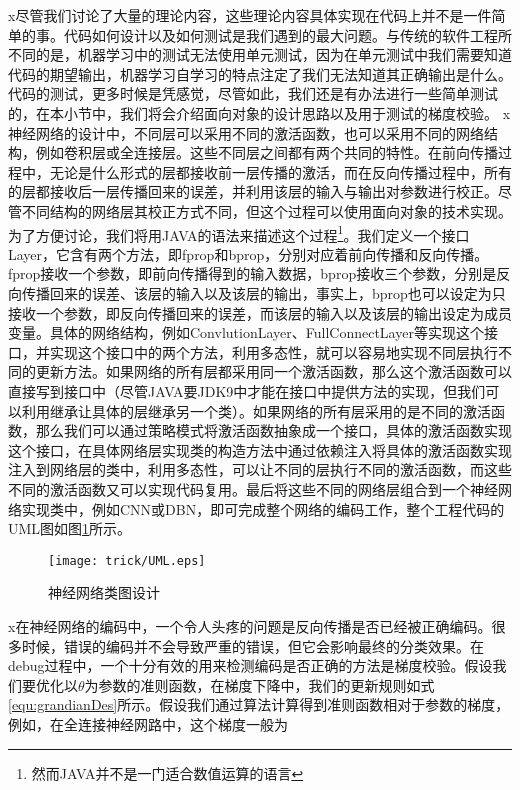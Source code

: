x尽管我们讨论了大量的理论内容，这些理论内容具体实现在代码上并不是一件简单的事。代码如何设计以及如何测试是我们遇到的最大问题。与传统的软件工程所不同的是，机器学习中的测试无法使用单元测试，因为在单元测试中我们需要知道代码的期望输出，机器学习自学习的特点注定了我们无法知道其正确输出是什么。代码的测试，更多时候是凭感觉，尽管如此，我们还是有办法进行一些简单测试的，在本小节中，我们将会介绍面向对象的设计思路以及用于测试的梯度校验。
x神经网络的设计中，不同层可以采用不同的激活函数，也可以采用不同的网络结构，例如卷积层或全连接层。这些不同层之间都有两个共同的特性。在前向传播过程中，无论是什么形式的层都接收前一层传播的激活，而在反向传播过程中，所有的层都接收后一层传播回来的误差，并利用该层的输入与输出对参数进行校正。尽管不同结构的网络层其校正方式不同，但这个过程可以使用面向对象的技术实现。为了方便讨论，我们将用JAVA的语法来描述这个过程\footnote{然而JAVA并不是一门适合数值运算的语言}。我们定义一个接口Layer，它含有两个方法，即fprop和bprop，分别对应着前向传播和反向传播。fprop接收一个参数，即前向传播得到的输入数据，bprop接收三个参数，分别是反向传播回来的误差、该层的输入以及该层的输出，事实上，bprop也可以设定为只接收一个参数，即反向传播回来的误差，而该层的输入以及该层的输出设定为成员变量。具体的网络结构，例如ConvlutionLayer、FullConnectLayer等实现这个接口，并实现这个接口中的两个方法，利用多态性，就可以容易地实现不同层执行不同的更新方法。如果网络的所有层都采用同一个激活函数，那么这个激活函数可以直接写到接口中（尽管JAVA要JDK9中才能在接口中提供方法的实现，但我们可以利用继承让具体的层继承另一个类）。如果网络的所有层采用的是不同的激活函数，那么我们可以通过策略模式将激活函数抽象成一个接口，具体的激活函数实现这个接口，在具体网络层实现类的构造方法中通过依赖注入将具体的激活函数实现注入到网络层的类中，利用多态性，可以让不同的层执行不同的激活函数，而这些不同的激活函数又可以实现代码复用。最后将这些不同的网络层组合到一个神经网络实现类中，例如CNN或DBN，即可完成整个网络的编码工作，整个工程代码的UML图如图\ref{img:UML}所示。
\begin{figure}[!htbp]
\centering
\texttt{[image: trick/UML.eps]}
\caption{神经网络类图设计}
\label{img:UML}
\end{figure}
x在神经网络的编码中，一个令人头疼的问题是反向传播是否已经被正确编码。很多时候，错误的编码并不会导致严重的错误，但它会影响最终的分类效果。在debug过程中，一个十分有效的用来检测编码是否正确的方法是梯度校验。假设我们要优化以$\theta$为参数的准则函数，在梯度下降中，我们的更新规则如式\eqref{equ:grandianDes}所示。假设我们通过算法计算得到准则函数相对于参数的梯度，例如，在全连接神经网路中，这个梯度一般为
